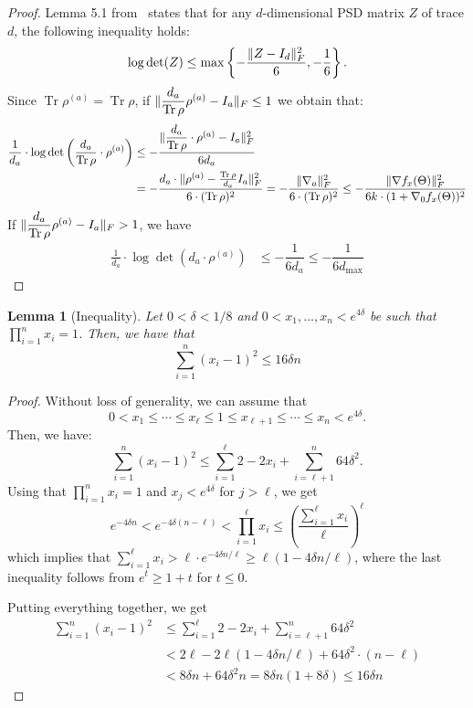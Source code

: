 \documentclass[aos]{imsart}
\newtheorem{lemma}[theorem]{Lemma}
\theoremstyle{definition}
\numberwithin{equation}{section}
\DeclareMathOperator{\tr}{Tr}
\DeclarePairedDelimiter{\norm}{\lVert}{\rVert}
\def\dmax{d_{\max}}
\begin{document}
\begin{proof}
	Lemma 5.1 from~\cite{GGOW19} states that for any $d$-dimensional PSD matrix $Z$ of trace $d$, the following inequality holds:
	$$ \log\det(Z) \leq \max\left\{- \dfrac{\norm{Z - I_d}_F^2}{6}, - \dfrac{1}{6} \right\}. $$
	Since $\tr \rho^{(a)} = \tr \rho$, if $\norm{\dfrac{d_a}{\tr \rho} \rho^{(a)} - I_a}_F \leq 1$ we obtain that:
	\begin{align*}
		\frac{1}{d_a} \cdot  \log\det\left(\dfrac{d_a}{\tr \rho} \cdot \rho^{(a)} \right) &\leq - \dfrac{\norm{\dfrac{d_a}{\tr \rho} \cdot \rho^{(a)} - I_a}_F^2}{6 d_a} \\
		&= - \dfrac{d_a \cdot \norm{ \rho^{(a)} - \frac{\tr \rho}{d_a} I_a}_F^2}{6 \cdot (\tr \rho)^2} = - \dfrac{\norm{\nabla_a}_F^2}{6 \cdot (\tr \rho)^2} \leq - \dfrac{\norm{\nabla f_x(\Theta)}_F^2}{6k \cdot (1 + \nabla_0 f_x(\Theta))^2}
	\end{align*}
	If $\norm{\dfrac{d_a}{\tr \rho} \rho^{(a)} - I_a}_F > 1$, we have
	\begin{align*}
		\frac{1}{d_a} \cdot  \log\det(d_a \cdot \rho^{(a)}) &\leq - \dfrac{1}{6 d_a} \leq - \dfrac{1}{6 \dmax}
	\end{align*}
\end{proof}

\begin{lemma}[Inequality]\label{lem:inequality}
	Let $0 < \delta < 1/8$ and $0 < x_1 , \ldots, x_n < e^{4 \delta}$ be such that $\prod_{i=1}^n x_i = 1$. Then, we have that
	$$ \sum_{i=1}^n (x_i-1)^2 \leq 16 \delta n $$
\end{lemma}

\begin{proof}
	Without loss of generality, we can assume that
	$$0 < x_1 \leq \cdots \leq x_\ell \leq 1 \leq x_{\ell+1} \leq \cdots \leq x_n < e^{4\delta}. $$
	Then, we have:
	$$ \sum_{i=1}^n (x_i-1)^2 \leq \sum_{i=1}^\ell 2 - 2x_i + \sum_{i = \ell+1}^n 64 \delta^2. $$
	Using that $\prod_{i=1}^n x_i = 1$ and $x_j < e^{4 \delta}$ for $j > \ell$, we get
	$$e^{-4 \delta n } < e^{-4 \delta(n-\ell)} < \prod_{i=1}^\ell x_i \leq \left( \dfrac{\sum_{i=1}^\ell x_i}{\ell} \right)^\ell $$
	which implies that $\displaystyle \sum_{i=1}^\ell x_i > \ell \cdot e^{-4 \delta n/\ell } \geq \ell (1- 4 \delta n /\ell)$, where the last inequality follows from $e^t \geq 1 + t$ for $t \leq 0$.

	Putting everything together, we get
	\begin{align*}
		\sum_{i=1}^n (x_i-1)^2 &\leq \sum_{i=1}^\ell 2 - 2x_i + \sum_{i = \ell+1}^n 64 \delta^2 \\
		&< 2 \ell - 2\ell (1-4 \delta n/\ell) + 64 \delta^2 \cdot (n - \ell) \\
		&< 8 \delta n + 64 \delta^2 n = 8\delta n (1 + 8 \delta) \leq 16 \delta n
	\end{align*}
\end{proof}
\end{document}
